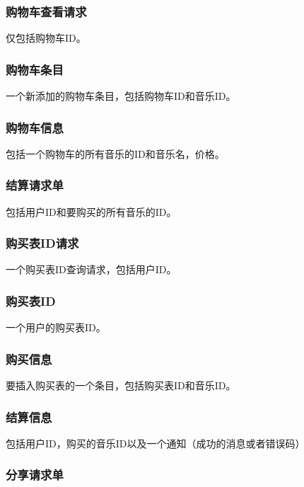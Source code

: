 \subsubsection{购物车查看请求}
仅包括购物车ID。

\subsubsection{购物车条目}

一个新添加的购物车条目，包括购物车ID和音乐ID。

\subsubsection{购物车信息}
包括一个购物车的所有音乐的ID和音乐名，价格。

\subsubsection{结算请求单}

包括用户ID和要购买的所有音乐的ID。

\subsubsection{购买表ID请求}

一个购买表ID查询请求，包括用户ID。

\subsubsection{购买表ID}

一个用户的购买表ID。

\subsubsection{购买信息}

要插入购买表的一个条目，包括购买表ID和音乐ID。

\subsubsection{结算信息}

包括用户ID，购买的音乐ID以及一个通知（成功的消息或者错误码）

\subsubsection{分享请求单}

